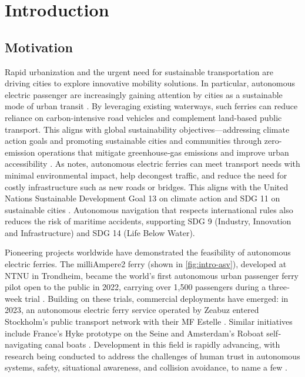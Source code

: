 
\chapter{Introduction}


\section{Motivation}

Rapid urbanization and the urgent need for sustainable transportation are driving cities to explore innovative mobility solutions. In particular, autonomous electric passenger are increasingly gaining attention by cities as a sustainable mode of urban transit \citep{Alsos2024}. By leveraging existing waterways, such ferries can reduce reliance on carbon-intensive road vehicles and complement land-based public transport. 
This aligns with global sustainability objectives---addressing climate action goals and promoting sustainable cities and communities through zero-emission operations that mitigate greenhouse‐gas emissions and improve urban accessibility \citep{dnvAutonomousUrban}. 
As \citet{dnvAutonomousUrban} notes, autonomous electric ferries can meet transport needs with minimal environmental impact, help decongest traffic, and reduce the need for costly infrastructure such as new roads or bridges. This aligns with the United Nations Sustainable Development Goal 13 on climate action and SDG 11 on sustainable cities \citep{UN2024}. Autonomous navigation that respects international rules also reduces the risk of maritime 
accidents, supporting SDG 9 (Industry, Innovation and Infrastructure) and SDG 14 (Life Below Water).

Pioneering projects worldwide have demonstrated the feasibility of autonomous electric ferries. The milliAmpere2 ferry (shown in \cref{fig:intro-asv}), developed at NTNU in Trondheim, became the world’s first autonomous urban passenger ferry pilot open to the public in 2022, carrying over 1,500 passengers during a three‐week trial \citep{Alsos2024}. Building on these trials, commercial deployments have emerged: in 2023, an autonomous electric ferry service operated by Zeabuz entered Stockholm’s public transport network with their MF Estelle \citep{Alsos2024}. Similar initiatives include France’s Hyke prototype on the Seine and Amsterdam’s Roboat self‐navigating canal boats \citep{Alsos2024}. Development in this field is rapidly advancing, with research being conducted to address the challenges of human trust in autonomous systems, safety, situational awareness, and collision avoidance, to name a few \citep{Eide2025}.

